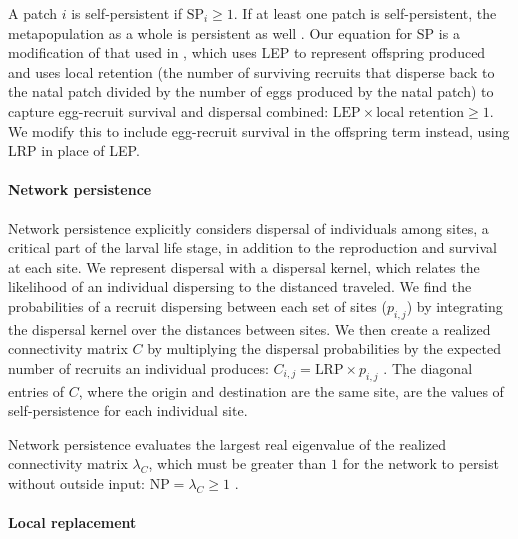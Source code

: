 \documentclass[12pt, oneside]{article}   	%
\begin{document}

A patch $i$ is self-persistent if $\text{SP}_i \geq 1$. If at least one patch is self-persistent, the metapopulation as a whole is persistent as well \citep{hastings_persistence_2006, burgess2014beyond}. Our equation for SP is a modification of that used in \cite{burgess2014beyond}, which uses LEP to represent offspring produced and uses local retention (the number of surviving recruits that disperse back to the natal patch divided by the number of eggs produced by the natal patch) to capture egg-recruit survival and dispersal combined: $\text{LEP} \times \text{local retention} \geq 1$. We modify this to include egg-recruit survival in the offspring term instead, using LRP in place of LEP. %

\paragraph*{Network persistence}

Network persistence explicitly considers dispersal of individuals among sites, a critical part of the larval life stage, in addition to the reproduction and survival at each site. We represent dispersal with a dispersal kernel, which relates the likelihood of an individual dispersing to the distanced traveled. We find the probabilities of a recruit dispersing between each set of sites ($p_{i,j}$) by integrating the dispersal kernel over the distances between sites. We then create a realized connectivity matrix $C$ by multiplying the dispersal probabilities by the expected number of recruits an individual produces: $C_{i,j} = \text{LRP} \times p_{i,j}$ \citep[][though we include egg-recruit survival in LRP, rather than in $p_{i,j}$ as they do]{burgess2014beyond}. The diagonal entries of $C$, where the origin and destination are the same site, are the values of self-persistence for each individual site. 

Network persistence evaluates the largest real eigenvalue of the realized connectivity matrix $\lambda_C$, which must be greater than $1$ for the network to persist without outside input: $\text{NP} = \lambda_C \geq 1$ \citep[e.g.][]{hastings_persistence_2006, white_population_2010, burgess2014beyond}.

\paragraph*{Local replacement}
\end{document}
